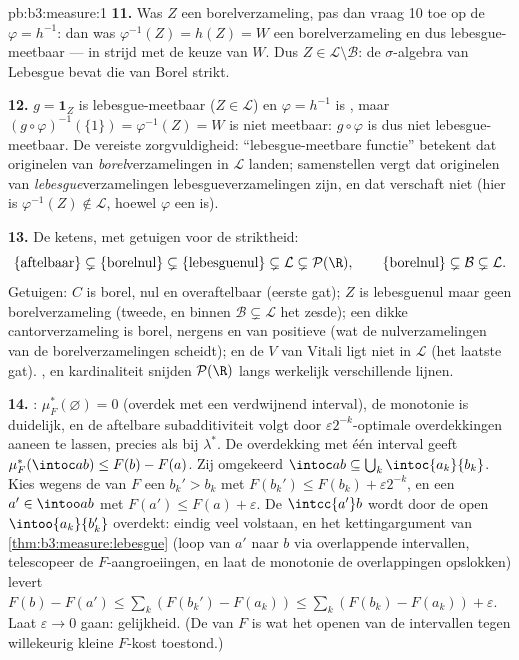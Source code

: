 \begin{solution}{pb:b3:measure:1}
\textbf{11.} Was $Z$ een borelverzameling, pas dan vraag 10 toe op
de  $\varphi = h^{-1}$: dan was $\varphi^{-1}(Z) = h(Z) =
W$ een borelverzameling en dus lebesgue-meetbaar --- in strijd met
de keuze van $W$. Dus $Z \in \mathcal L \setminus \mathcal B$: de
$\sigma$-algebra van Lebesgue bevat die van Borel strikt.

\textbf{12.} $g = \mathbf 1_Z$ is lebesgue-meetbaar ($Z \in
\mathcal L$) en $\varphi = h^{-1}$ is , maar
$(g\circ\varphi)^{-1}(\{1\}) = \varphi^{-1}(Z) = W$ is niet
meetbaar: $g \circ \varphi$ is dus niet lebesgue-meetbaar. De
vereiste zorgvuldigheid: ``lebesgue-meetbare functie'' betekent
dat originelen van \emph{borel}verzamelingen in $\mathcal L$
landen; samenstellen vergt dat originelen van
\emph{lebesgue}verzamelingen lebesgueverzamelingen zijn, en dat
verschaft  niet (hier is $\varphi^{-1}(Z) \notin
\mathcal L$, hoewel $\varphi$ een  is).

\textbf{13.} De ketens, met getuigen voor de striktheid:
\[
\{\text{aftelbaar}\} \subsetneq \{\text{borelnul}\}
\subsetneq \{\text{lebesguenul}\} \subsetneq \mathcal L
\subsetneq \mathcal P(\R),
\qquad
\{\text{borelnul}\} \subsetneq \mathcal B \subsetneq
\mathcal L .
\]
Getuigen: $C$ is borel, nul en overaftelbaar (eerste gat); $Z$ is
lebesguenul maar geen borelverzameling (tweede, en binnen
$\mathcal B \subsetneq \mathcal L$ het zesde); een dikke
cantorverzameling is borel, nergens  en van positieve 
(wat de nulverzamelingen van de borelverzamelingen scheidt); en de
$V$ van Vitali ligt niet in $\mathcal L$ (het laatste gat). ,
 en kardinaliteit snijden $\mathcal P(\R)$ langs
werkelijk verschillende lijnen.

\textbf{14.} : $\mu_F^*(\varnothing) = 0$ (overdek met
een verdwijnend interval), de monotonie is duidelijk, en de
aftelbare subadditiviteit volgt door $\varepsilon2^{-k}$-optimale
overdekkingen aaneen te lassen, precies als bij $\lambda^*$. De
overdekking met één interval geeft $\mu_F^*(\intoc ab) \leq F(b) -
F(a)$. Zij omgekeerd $\intoc ab \subseteq
\bigcup_k\intoc{a_k}{b_k}$. Kies wegens de  van $F$
een $b_k' > b_k$ met $F(b_k') \leq F(b_k) + \varepsilon2^{-k}$, en
een $a' \in \intoo ab$ met $F(a') \leq F(a) + \varepsilon$. De
 $\intcc{a'}b$ wordt door de open $\intoo{a_k}{b_k'}$
overdekt: eindig veel volstaan, en het kettingargument van
\cref{thm:b3:measure:lebesgue} (loop van $a'$ naar $b$ via
overlappende intervallen, telescopeer de $F$-aangroeiingen, en
laat de monotonie de overlappingen opslokken) levert $F(b) - F(a')
\leq \sum_k(F(b_k') - F(a_k)) \leq \sum_k(F(b_k) - F(a_k)) +
\varepsilon$. Laat $\varepsilon \to 0$ gaan: gelijkheid. (De
 van $F$ is wat het openen van de intervallen tegen
willekeurig kleine $F$-kost toestond.)


\end{solution}
